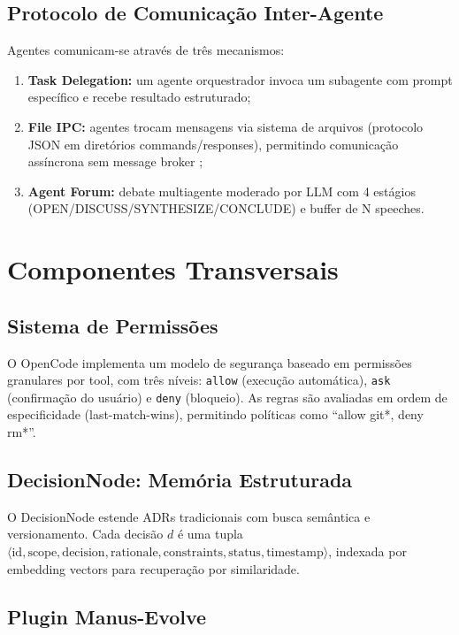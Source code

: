 \documentclass[12pt,a4paper,sumario=tradicional]{abntex2}
\begin{document}
\subsection{Protocolo de Comunicação Inter-Agente}

Agentes comunicam-se através de três mecanismos:

\begin{enumerate}[leftmargin=*]
    \item \textbf{Task Delegation:} um agente orquestrador invoca um subagente com prompt específico e recebe resultado estruturado;
    \item \textbf{File IPC:} agentes trocam mensagens via sistema de arquivos (protocolo JSON em diretórios commands/responses), permitindo comunicação assíncrona sem message broker \cite{avunoori2026aesp};
    \item \textbf{Agent Forum:} debate multiagente moderado por LLM com 4 estágios (OPEN/DISCUSS/SYNTHESIZE/CONCLUDE) e buffer de N speeches.
\end{enumerate}

\section{Componentes Transversais}

\subsection{Sistema de Permissões}

O OpenCode implementa um modelo de segurança baseado em permissões granulares por tool, com três níveis: \texttt{allow} (execução automática), \texttt{ask} (confirmação do usuário) e \texttt{deny} (bloqueio). As regras são avaliadas em ordem de especificidade (last-match-wins), permitindo políticas como ``allow git*, deny rm*''.

\subsection{DecisionNode: Memória Estruturada}

O DecisionNode estende ADRs tradicionais com busca semântica e versionamento. Cada decisão $d$ é uma tupla $\langle \text{id}, \text{scope}, \text{decision}, \text{rationale}, \text{constraints}, \text{status}, \text{timestamp} \rangle$, indexada por embedding vectors para recuperação por similaridade.

\subsection{Plugin Manus-Evolve}
\end{document}
